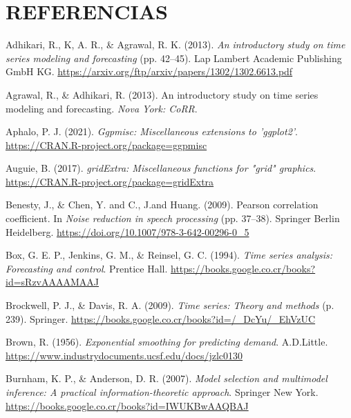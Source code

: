 \documentclass[
]{article}
\newlength{\cslhangindent}
\newlength{\cslentryspacingunit} %
\newenvironment{CSLReferences}[2] %
 {%
  \setlength{\parindent}{0pt}
  \ifodd #1
  \let\oldpar\par
  \def\par{\hangindent=\cslhangindent\oldpar}
  \fi
  \setlength{\parskip}{#2\cslentryspacingunit}
 }%
 {}
\begin{document}
\newpage

\section{REFERENCIAS}

\hypertarget{refs}{}
\begin{CSLReferences}{1}{0}
\leavevmode{}%
Adhikari, R., K, A. R., \& Agrawal, R. K. (2013). \emph{An introductory
study on time series modeling and forecasting} (pp. 42--45). Lap Lambert
Academic Publishing GmbH KG.
\url{https://arxiv.org/ftp/arxiv/papers/1302/1302.6613.pdf}

\leavevmode{}%
Agrawal, R., \& Adhikari, R. (2013). An introductory study on time
series modeling and forecasting. \emph{Nova York: CoRR}.

\leavevmode{}%
Aphalo, P. J. (2021). \emph{Ggpmisc: Miscellaneous extensions to
'ggplot2'}. \url{https://CRAN.R-project.org/package=ggpmisc}

\leavevmode{}%
Auguie, B. (2017). \emph{gridExtra: Miscellaneous functions for "grid"
graphics}. \url{https://CRAN.R-project.org/package=gridExtra}

\leavevmode{}%
Benesty, J., \& Chen, Y. and C., J.and Huang. (2009). Pearson
correlation coefficient. In \emph{Noise reduction in speech processing}
(pp. 37--38). Springer Berlin Heidelberg.
\url{https://doi.org/10.1007/978-3-642-00296-0_5}

\leavevmode{}%
Box, G. E. P., Jenkins, G. M., \& Reinsel, G. C. (1994). \emph{Time
series analysis: Forecasting and control}. Prentice Hall.
\url{https://books.google.co.cr/books?id=sRzvAAAAMAAJ}

\leavevmode{}%
Brockwell, P. J., \& Davis, R. A. (2009). \emph{Time series: Theory and
methods} (p. 239). Springer.
\url{https://books.google.co.cr/books?id=/_DcYu/_EhVzUC}

\leavevmode{}%
Brown, R. (1956). \emph{Exponential smoothing for predicting demand}.
A.D.Little. \url{https://www.industrydocuments.ucsf.edu/docs/jzlc0130}

\leavevmode{}%
Burnham, K. P., \& Anderson, D. R. (2007). \emph{Model selection and
multimodel inference: A practical information-theoretic approach}.
Springer New York.
\url{https://books.google.co.cr/books?id=IWUKBwAAQBAJ}


\end{CSLReferences}
\end{document}
